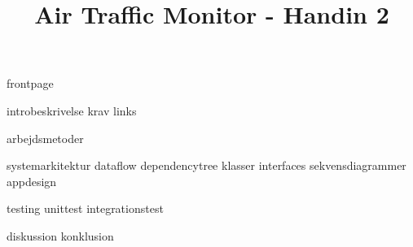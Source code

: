 \documentclass[a4paper]{article}								%
\title{Air Traffic Monitor - Handin 2}
\begin{document}

	{frontpage}

	\tableofcontents\thispagestyle{fancy} \newpage
	
	
	{introbeskrivelse}
	{krav}
	{links}

	{arbejdsmetoder}

	{systemarkitektur}
	{dataflow}
	{dependencytree}
	{klasser}
	{interfaces}
	{sekvensdiagrammer}
	{appdesign}

	{testing}
	{unittest}
	{integrationstest}

	{diskussion}
	{konklusion}
	



\end{document}
